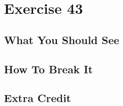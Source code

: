 \chapter{Exercise 43}


\section{What You Should See}


\section{How To Break It}


\section{Extra Credit}



